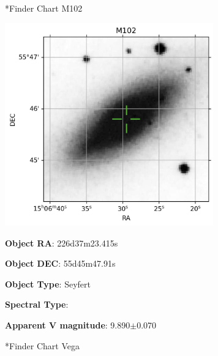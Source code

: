 \documentclass[12pt,preprintnumbers,amsmath,amssymb,nofootinbib,superscriptaddress]{revtex4-1}
\begin{document}
\newpage

*{Finder Chart M102}\label{Ueff}

\begin{minipage}{0.6\textwidth}
    \includegraphics[width=9cm]{example_output/finder_M102.jpg}
\vspace{-2cm}

\end{minipage}
\begin{minipage}{0.3\textwidth}

\textbf{Object RA}: 226d37m23.415s

\textbf{Object DEC}: 55d45m47.91s

\textbf{Object Type}: Seyfert

\textbf{Spectral Type}: 

\textbf{Apparent V magnitude}: 9.890$\pm$0.070

\end{minipage}

\newpage

*{Finder Chart Vega}\label{Ueff}
\end{document}
